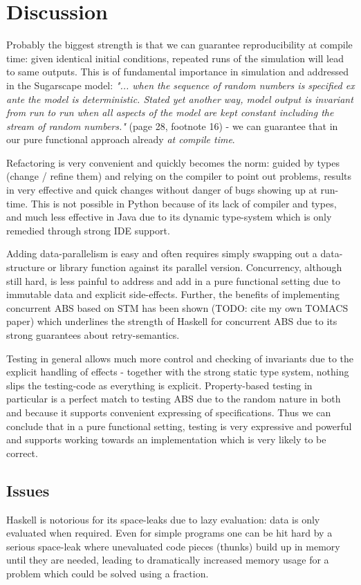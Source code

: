 \section{Discussion}
\label{sec:discussion}
Probably the biggest strength is that we can guarantee reproducibility at compile time: given identical initial conditions, repeated runs of the simulation will lead to same outputs. This is of fundamental importance in simulation and addressed in the Sugarscape model: \textit{"... when the sequence of random numbers is specified ex ante the model is deterministic. Stated yet another way, model output is invariant from run to run when all aspects of the model are kept constant including the stream of random numbers."} (page 28, footnote 16) - we can guarantee that in our pure functional approach already \textit{at compile time}.

Refactoring is very convenient and quickly becomes the norm: guided by types (change / refine them) and relying on the compiler to point out problems, results in very effective and quick changes without danger of bugs showing up at run-time. This is not possible in Python because of its lack of compiler and types, and much less effective in Java due to its dynamic type-system which is only remedied through strong IDE support.

Adding data-parallelism is easy and often requires simply swapping out a data-structure or library function against its parallel version. Concurrency, although still hard, is less painful to address and add in a pure functional setting due to immutable data and explicit side-effects. Further, the benefits of implementing concurrent ABS based on STM has been shown (TODO: cite my own TOMACS paper) which underlines the strength of Haskell for concurrent ABS due to its strong guarantees about retry-semantics.

Testing in general allows much more control and checking of invariants due to the explicit handling of effects - together with the strong static type system, nothing slips the testing-code as everything is explicit. Property-based testing in particular is a perfect match to testing ABS due to the random nature in both and because it supports convenient expressing of specifications. Thus we can conclude that in a pure functional setting, testing is very expressive and powerful and supports working towards an implementation which is very likely to be correct.

\subsection{Issues}
Haskell is notorious for its space-leaks due to lazy evaluation: data is only evaluated when required. Even for simple programs one can be hit hard by a serious space-leak where unevaluated code pieces (thunks) build up in memory until they are needed, leading to dramatically increased memory usage for a problem which could be solved using a fraction.


